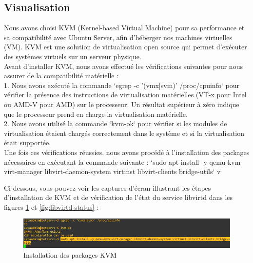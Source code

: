 \subsection{Visualisation}
Nous avons choisi KVM (Kernel-based Virtual Machine) pour sa performance et sa compatibilité avec Ubuntu Server, afin d'héberger nos machines virtuelles (VM). KVM est une solution de virtualisation open source qui permet d'exécuter des systèmes virtuels sur un serveur physique. \\

Avant d'installer KVM, nous avons effectué les vérifications suivantes pour nous assurer de la compatibilité matérielle : \\

1. Nous avons exécuté la commande `egrep -c '(vmx|svm)' /proc/cpuinfo` pour vérifier la présence des instructions de virtualisation matérielles (VT-x pour Intel ou AMD-V pour AMD) sur le processeur. Un résultat supérieur à zéro indique que le processeur prend en charge la virtualisation matérielle. \\

2. Nous avons utilisé la commande `kvm-ok` pour vérifier si les modules de virtualisation étaient chargés correctement dans le système et si la virtualisation était supportée. \\

Une fois ces vérifications réussies, nous avons procédé à l'installation des packages nécessaires en exécutant la commande suivante : `sudo apt install -y qemu-kvm virt-manager libvirt-daemon-system virtinst libvirt-clients bridge-utils` v

Ci-dessous, vous pouvez voir les captures d'écran illustrant les étapes d'installation de KVM et de vérification de l'état du service libvirtd dans les figures  \ref{fig:kvm-installation} et \ref{fig:libvirtd-status}  : \\

\begin{figure}[H]
 \centering
    \includegraphics[width=15cm]{Images/installkvm1.png}
    \caption{Installation des packages KVM}
    \label{fig:kvm-installation}
\end{figure}

